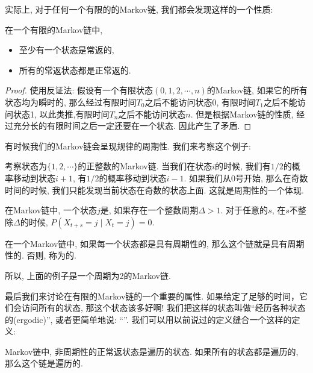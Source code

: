 实际上, 对于任何一个有限的的Markov链, 我们都会发现这样的一个性质: 

\begin{theorem}
    \label{thm:finite-prop}
    在一个有限的Markov链中, 
    \begin{itemize}
        \item 至少有一个状态是常返的, 
        \item 所有的常返状态都是正常返的. 
    \end{itemize}    
\end{theorem}

\begin{proof}
    使用反证法: 假设有一个有限状态$(0,1,2,\cdots, n)$的Markov链, 如果它的所有状态均为瞬时的, 那么经过有限时间$T_0$之后不能访问状态0, 有限时间$T_1$之后不能访问状态1, 以此类推,有限时间$T_n$之后不能访问状态$n$. 但是根据Markov链的性质, 经过充分长的有限时间之后一定还要在一个状态. 因此产生了矛盾. 
\end{proof}

有时候我们的Markov链会呈现规律的周期性. 我们来考察这个例子: 

\begin{example}
    考察状态为$\{1,2,\cdots\}$的正整数的Markov链. 当我们在状态$i$的时候, 我们有$1/2$的概率移动到状态$i+1$, 有$1/2$的概率移动到状态$i-1$. 如果我们从0号开始, 那么在奇数时间的时候, 我们只能发现当前状态在奇数的状态上面. 这就是周期性的一个体现. 
\end{example}

\begin{definition}
    在Markov链中, 一个状态$j$是, 如果存在一个整数周期$\Delta>1$. 对于任意的$s$, 在$s$不整除$\Delta$的时候, $P\left(X_{t+s}=j \mid X_t=j\right)=0$. 

    在一个Markov链中, 如果每一个状态都是具有周期性的, 那么这个链就是具有周期性的. 否则, 称为的. 
\end{definition}

所以, 上面的例子是一个周期为2的Markov链. 

最后我们来讨论在有限的Markov链的一个重要的属性. 如果给定了足够的时间，它们会访问所有的状态, 那这个状态该多好啊! 我们把这样的状态叫做``经历各种状态的(ergodic)'', 或者更简单地说: ``''. 我们可以用以前说过的定义缝合一个这样的定义: 

\begin{definition}
    Markov链中, 非周期性的正常返状态是遍历的状态. 如果所有的状态都是遍历的, 那么这个链是遍历的. 
\end{definition}

